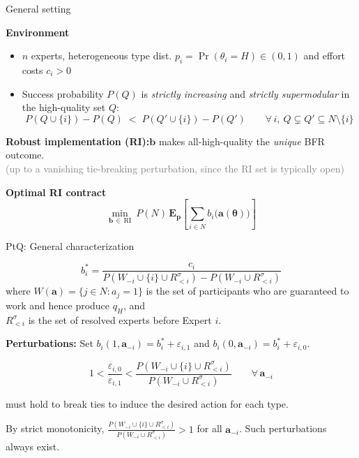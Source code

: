 \documentclass[10pt,aspectratio=169, compressed]{beamer}
\begin{document}
\begin{frame}{General setting}

\textbf{Environment}
\begin{itemize}
  \item $n$ experts, heterogeneous type dist. $p_i = \Pr(\theta_i = H) \in (0,1)$ and effort costs $c_i > 0$
  \item Success probability $P(Q)$ is \emph{strictly increasing} and \emph{strictly supermodular} in the high-quality set $Q$:
  \[
    P(Q\cup\{i\})-P(Q)\;<\;P(Q'\cup\{i\})-P(Q')
    \qquad \forall\, i,\ Q\subsetneq Q'\subseteq N\setminus\{i\}
  \]
\end{itemize}

\vspace{1.5em}

\textbf{Robust implementation (RI):}\quad $\mathbf b$ makes all-high-quality the \emph{unique} BFR outcome.\\[0.3em]
\textcolor{gray}{\small (up to a vanishing tie-breaking perturbation, since the RI set is typically open)}

\vspace{1.5em}

\textbf{Optimal RI contract}
$$\min_{\mathbf b\,\in\,\mathrm{RI}}\ P(N)\,\mathbf E_{\mathbf p}\!\left[\sum_{i\in N} b_i\big(\mathbf a(\mathbf\theta)\big)\right]$$

\end{frame}




\begin{frame}[noframenumbering]{PtQ: General characterization}

$$b_i^* = \frac{c_i}{P(W_{-i} \cup \{i\} \cup R_{<i}^{\sigma}) - P(W_{-i} \cup R_{<i}^{\sigma})}$$
where $W(\mathbf{a}) = \{j \in N: a_j = 1\}$ is the set of participants who are guaranteed to work{ and hence produce} $q_H$,
and \\
$R_{<i}^{\sigma}$ is the {set of} resolved experts before Expert $i$.
\vspace{0.8em}


\textbf{Perturbations:} Set $b_i(1, \mathbf{a}_{-i}) = b^*_i + \varepsilon_{i,1}$ and $b_i(0, \mathbf{a}_{-i}) = b^*_i + \varepsilon_{i,0}$.
\vspace{0.4em}

{\footnotesize
$$1 < \frac{\varepsilon_{i,0}}{\varepsilon_{i,1}} < \frac{P(W_{-i} \cup \{i\} \cup R^\sigma_{<i} ) }{P(W_{-i} \cup R^\sigma_{<i})} \qquad \forall\, \mathbf{a}_{-i}$$
}

must hold to break ties to induce the desired action for each type.

\vspace{0.8em}

By strict monotonicity, $\frac{P(W_{-i} \cup \{i\} \cup R^\sigma_{<i} ) }{P(W_{-i} \cup R^\sigma_{<i})} > 1$ for all $\mathbf{a}_{-i}$. Such perturbations always exist.

\end{frame}
\end{document}
